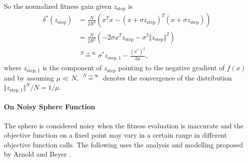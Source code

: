 So the normalized fitness gain given $z_{\text{step}}$ is
\begin{align}{}
\delta^*(z_{\text{step}}) & = \frac{N}{2R^2} (x^Tx - (x+\sigma z_{\text{step}})^T (x+\sigma z_{\text{step}})) \nonumber\\
& = \frac{N}{2R^2} (-2 \sigma x^Tz_{\text{step}} - \sigma^2 \Vert z_{\text{step}}\Vert^2 ) \nonumber\\
& \overset{N \rightarrow \infty}{=} \sigma^* z_{\text{step},1} - \frac{({\sigma^*}) ^2}{2\mu} \label{eqn:delta_z_step}{},
\end{align}
where $z_{\text{step},1} $ is the component of $z_{\text{step}}$ pointing to the negative gradient of $f(x)$ and by assuming $\mu \ll N$, $\overset{ N \rightarrow \infty}{=}$ denotes the convergence of the distribution $\Vert z_{\text{step},1} \Vert^N/N = 1/\mu$.


\paragraph{On Noisy Sphere Function}
The sphere is considered noisy when the fitness evaluation is inaccurate and the objective function on a fixed point may vary in a certain range in different objective function calls. The following uses the analysis and modelling proposed by Arnold and Beyer \cite{ARNOLD2001127}. 

